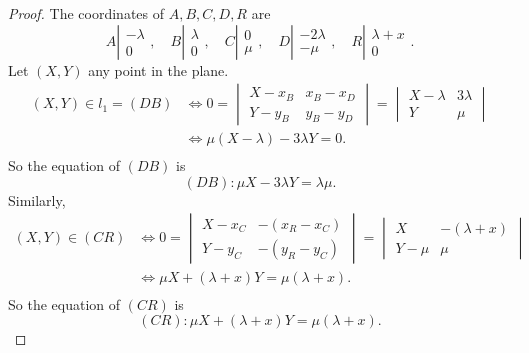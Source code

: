\documentclass[11pt,a4paper]{article}
\begin{document}
\begin{proof}
	The coordinates of $A,B,C,D,R$ are
$$ A \left | 
\begin{array}{c}
  -\lambda\\
 0 
\end{array}
\right.
, \quad 
B \left | 
\begin{array}{c}
  \lambda\\
 0 
\end{array}
\right.
, \quad 
C \left | 
\begin{array}{c}
 0\\
\mu
\end{array}
\right.
, \quad 
D \left | 
\begin{array}{c}
  -2\lambda\\
-\mu
\end{array}
\right.
, \quad 
R \left | 
\begin{array}{c}
  \lambda + x\\
 0 
\end{array}
\right.
.
$$	
Let $(X,Y)$ any point in the plane.
\begin{align*}
(X,Y) \in l_1 = (DB) &\iff 0 = \begin{vmatrix} X - x_B & x_B - x_D \\Y-y_B & y_B - y_D \end{vmatrix} = \begin{vmatrix} X - \lambda & 3 \lambda \\Y&\mu \end{vmatrix}\\
	&\iff \mu(X-\lambda) - 3\lambda Y= 0.\\
\end{align*}
So the equation of $(DB)$ is
$$(DB) : \mu X - 3 \lambda Y = \lambda \mu.$$
Similarly,
\begin{align*}
(X,Y) \in (CR) &\iff 0 = \begin{vmatrix} X - x_C & -(x_R - x_C) \\Y-y_C &-(y_R-y_C) \end{vmatrix} = \begin{vmatrix} X  & -( \lambda +x)\\Y - \mu &\mu \end{vmatrix}\\
	&\iff \mu X +(\lambda+x) Y = \mu(\lambda + x) .\\
\end{align*}
So the equation of $(CR)$ is
$$(CR) : \mu X +(\lambda + x) Y =\mu(\lambda + x).$$


\end{proof}
\end{document}
